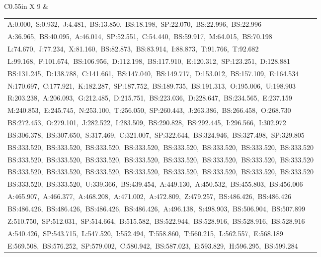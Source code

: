 \documentclass[10pt,a4paper]{article}
\begin{document}
\begin{center}
\begin{tabularx}{\textwidth}{
    C{0.55in}
    X
}
9 &
\begin{tabular}[t]{@{}l@{}}
A:0.000,\ S:0.932,\ J:4.481,\ BS:13.850,\ BS:18.198,\ SP:22.070,\ BS:22.996,\ BS:22.996\\
A:36.965,\ BS:40.095,\ A:46.014,\ SP:52.551,\ C:54.440,\ BS:59.917,\ M:64.015,\ BS:70.198\\
L:74.670,\ J:77.234,\ X:81.160,\ BS:82.873,\ BS:83.914,\ I:88.873,\ T:91.766,\ T:92.682\\
L:99.168,\ F:101.674,\ BS:106.956,\ D:112.198,\ BS:117.910,\ E:120.312,\ SP:123.251,\ D:128.881\\
BS:131.245,\ D:138.788,\ C:141.661,\ BS:147.040,\ BS:149.717,\ D:153.012,\ BS:157.109,\ E:164.534\\
N:170.697,\ C:177.921,\ K:182.287,\ SP:187.752,\ BS:189.735,\ BS:191.313,\ O:195.006,\ U:198.903\\
R:203.238,\ A:206.093,\ G:212.485,\ D:215.751,\ BS:223.036,\ D:228.647,\ BS:234.565,\ E:237.159\\
M:240.853,\ E:245.745,\ N:253.100,\ T:256.050,\ SP:260.443,\ J:263.386,\ BS:266.458,\ O:268.730\\
BS:272.453,\ O:279.101,\ J:282.522,\ I:283.509,\ BS:290.828,\ BS:292.445,\ I:296.566,\ I:302.972\\
BS:306.378,\ BS:307.650,\ S:317.469,\ C:321.007,\ SP:322.644,\ BS:324.946,\ BS:327.498,\ SP:329.805\\
BS:333.520,\ BS:333.520,\ BS:333.520,\ BS:333.520,\ BS:333.520,\ BS:333.520,\ BS:333.520,\ BS:333.520\\
BS:333.520,\ BS:333.520,\ BS:333.520,\ BS:333.520,\ BS:333.520,\ BS:333.520,\ BS:333.520,\ BS:333.520\\
BS:333.520,\ BS:333.520,\ BS:333.520,\ BS:333.520,\ BS:333.520,\ BS:333.520,\ BS:333.520,\ BS:333.520\\
BS:333.520,\ BS:333.520,\ U:339.366,\ BS:439.454,\ A:449.130,\ A:450.532,\ BS:455.803,\ BS:456.006\\
A:465.907,\ A:466.377,\ A:468.208,\ A:471.002,\ A:472.809,\ Z:479.257,\ BS:486.426,\ BS:486.426\\
BS:486.426,\ BS:486.426,\ BS:486.426,\ BS:486.426,\ A:496.138,\ S:498.903,\ BS:506.904,\ BS:507.899\\
Z:510.750,\ SP:512.031,\ SP:514.664,\ B:515.582,\ BS:522.944,\ BS:528.916,\ BS:528.916,\ BS:528.916\\
A:540.426,\ SP:543.715,\ L:547.520,\ I:552.494,\ T:558.860,\ T:560.215,\ L:562.557,\ E:568.189\\
E:569.508,\ BS:576.252,\ SP:579.002,\ C:580.942,\ BS:587.023,\ E:593.829,\ H:596.295,\ BS:599.284\\

\end{tabular}
\end{tabularx}
\end{center}
\end{document}
